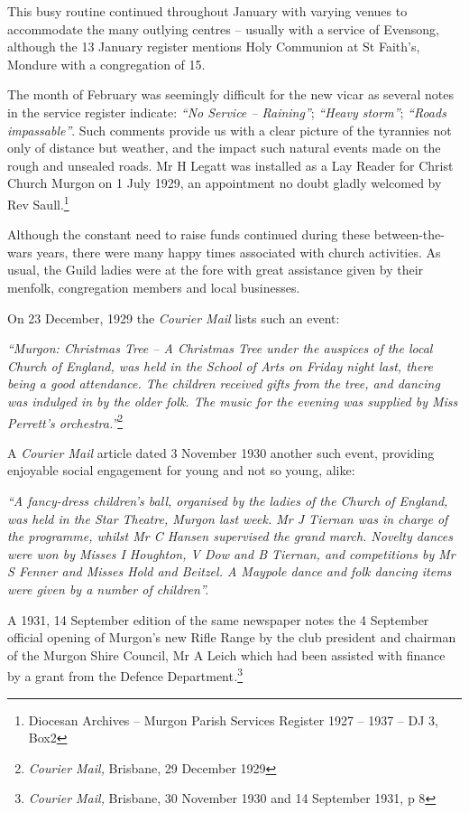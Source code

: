 This busy routine continued throughout January with varying venues to accommodate the many outlying centres -- usually with a service of Evensong, although the 13 January register mentions Holy Communion at St Faith's, Mondure with a congregation of 15.

The month of February was seemingly difficult for the new vicar as several notes in the service register indicate: \emph{``No Service -- Raining''}; \emph{``Heavy storm''}; \emph{``Roads impassable''}. Such comments provide us with a clear picture of the tyrannies not only of distance but weather, and the impact such natural events made on the rough and unsealed roads. Mr H Legatt was installed as a Lay Reader for Christ Church Murgon on 1 July 1929, an appointment no doubt gladly welcomed by Rev Saull.\footnote{Diocesan Archives -- Murgon Parish Services Register 1927 -- 1937 -- DJ 3, Box2}

Although the constant need to raise funds continued during these between-the-wars years, there were many happy times associated with church activities. As usual, the Guild ladies were at the fore with great assistance given by their menfolk, congregation members and local businesses.

On 23 December, 1929 the \emph{Courier Mail} lists such an event:

\emph{``Murgon: Christmas Tree -- A Christmas Tree under the auspices of the local Church of England, was held in the School of Arts on Friday night last, there being a good attendance. The children received gifts from the tree, and dancing was indulged in by the older folk. The music for the evening was supplied by Miss Perrett's orchestra.''}\footnote{\emph{Courier Mail,} Brisbane, 29 December 1929}

A \emph{Courier Mail} article dated 3 November 1930 another such event, providing enjoyable social engagement for young and not so young, alike:

\emph{``A fancy-dress children's ball, organised by the ladies of the Church of England, was held in the Star Theatre, Murgon last week. Mr J Tiernan was in charge of the programme, whilst Mr C Hansen supervised the grand march. Novelty dances were won by Misses I Houghton, V Dow and B Tiernan, and competitions by Mr S Fenner and Misses Hold and Beitzel. A Maypole dance and folk dancing items were given by a number of children''.}

A 1931, 14 September edition of the same newspaper notes the 4 September official opening of Murgon's new Rifle Range by the club president and chairman of the Murgon Shire Council, Mr A Leich which had been assisted with finance by a grant from the Defence Department\emph{.}\footnote{\emph{Courier Mail,} Brisbane, 30 November 1930 and 14 September 1931, p 8}

